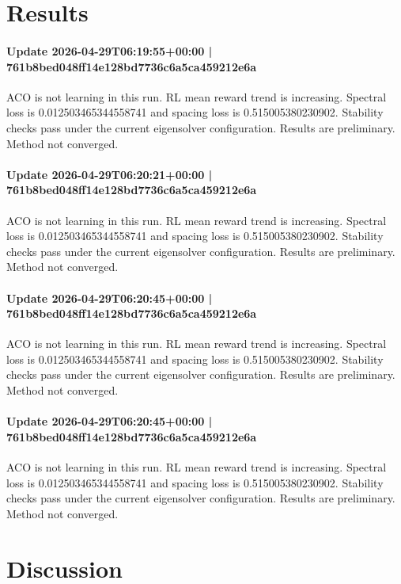 \documentclass{article}
\begin{document}
\section{Results}
\paragraph{Update 2026-04-29T06:19:55+00:00 | 761b8bed048ff14e128bd7736c6a5ca459212e6a}

ACO is not learning in this run. RL mean reward trend is increasing. Spectral loss is 0.012503465344558741 and spacing loss is 0.515005380230902. Stability checks pass under the current eigensolver configuration. Results are preliminary. Method not converged.

\paragraph{Update 2026-04-29T06:20:21+00:00 | 761b8bed048ff14e128bd7736c6a5ca459212e6a}

ACO is not learning in this run. RL mean reward trend is increasing. Spectral loss is 0.012503465344558741 and spacing loss is 0.515005380230902. Stability checks pass under the current eigensolver configuration. Results are preliminary. Method not converged.

\paragraph{Update 2026-04-29T06:20:45+00:00 | 761b8bed048ff14e128bd7736c6a5ca459212e6a}

ACO is not learning in this run. RL mean reward trend is increasing. Spectral loss is 0.012503465344558741 and spacing loss is 0.515005380230902. Stability checks pass under the current eigensolver configuration. Results are preliminary. Method not converged.

\paragraph{Update 2026-04-29T06:20:45+00:00 | 761b8bed048ff14e128bd7736c6a5ca459212e6a}

ACO is not learning in this run. RL mean reward trend is increasing. Spectral loss is 0.012503465344558741 and spacing loss is 0.515005380230902. Stability checks pass under the current eigensolver configuration. Results are preliminary. Method not converged.

\section{Discussion}
\end{document}
